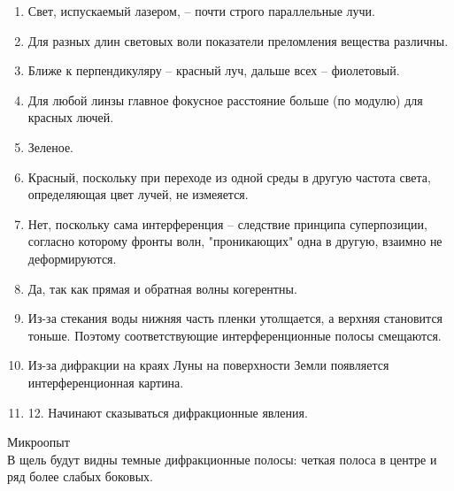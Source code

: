 \documentclass[twocolumn,4pt]{article}
\begin{document}
\begin{enumerate}
    \item Свет, испускаемый лазером, -- почти строго параллельные лучи. 
    \item Для разных длин световых воли показатели преломления вещества различны. 
    \item Ближе к перпендикуляру -- красный луч, дальше всех -- фиолетовый. 
    \item Для любой линзы главное фокусное расстояние больше (по модулю) для красных лючей. 
    \item Зеленое. 
    \item Красный, поскольку при переходе из одной среды в другую частота света, определяющая цвет лучей, не измеяется. 
    \item Нет, поскольку сама интерференция -- следствие принципа суперпозиции, согласно которому фронты волн, "проникающих" одна в другую, взаимно не деформируются. 
    \item Да, так как прямая и обратная волны когерентны. 
    \item Из-за стекания воды нижняя часть пленки утолщается, а верхняя становится тоньше. Поэтому соответствующие интерференционные полосы смещаются. 
    \item Из-за дифракции на краях Луны на поверхности Земли появляется интерференционная картина. 
    \item 12. Начинают сказываться дифракционные явления. 
\end{enumerate}

Микроопыт \\
В щель будут видны темные дифракционные полосы: четкая полоса в центре и ряд более слабых боковых. \\
\end{document}
